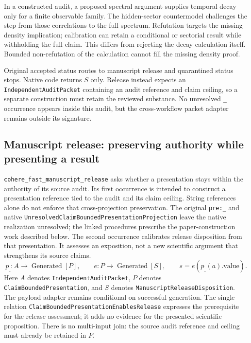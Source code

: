 In a constructed audit, a proposed spectral argument supplies temporal decay only for a finite observable family. The hidden-sector countermodel challenges the step from those correlations to the full spectrum. Refutation targets the missing density implication; calibration can retain a conditional or sectorial result while withholding the full claim. This differs from rejecting the decay calculation itself. Bounded non-refutation of the calculation cannot fill the missing density proof.

Original accepted status routes to manuscript release and quarantined status stops. Native code returns $S$ only. Release instead expects an \texttt{Independent\allowbreak Audit\allowbreak Packet} containing an audit reference and claim ceiling, so a separate construction must retain the reviewed substance. No unresolved \texttt{\_} occurrence appears inside this audit, but the cross-workflow packet adapter remains outside its signature.



\subsection{Manuscript release: preserving authority while presenting a result}
\label{app:granular-cohere_fast_manuscript_release}
\texttt{cohere\_fast\_manuscript\_release} asks whether a presentation stays within the authority of its source audit. Its first occurrence is intended to construct a presentation reference tied to the audit and its claim ceiling. String references alone do not enforce that cross-projection preservation. The original \texttt{pre:\_} and native \texttt{Unresolved\allowbreak Claim\allowbreak Bounded\allowbreak Presentation\allowbreak Projection} leave the native realization unresolved; the linked procedures prescribe the paper-construction work described below. The second occurrence calibrates release disposition from that presentation. It assesses an exposition, not a new scientific argument that strengthens its source claims.
\[
 p_{\_}:A\to\operatorname{Generated}[P],\qquad
 e:P\to\operatorname{Generated}[S],\qquad s=e(p_{\_}(a).\mathrm{value}).
\]
Here $A$ denotes \texttt{Independent\allowbreak Audit\allowbreak Packet}, $P$ denotes \texttt{Claim\allowbreak Bounded\allowbreak Presentation}, and $S$ denotes \texttt{Manuscript\allowbreak Release\allowbreak Disposition}. The payload adapter remains conditional on successful generation. The single relation \texttt{Claim\allowbreak Bounded\allowbreak Presentation\allowbreak Enables\allowbreak Release} expresses the prerequisite for the release assessment; it adds no evidence for the presented scientific proposition. There is no multi-input join: the source audit reference and ceiling must already be retained in $P$.

